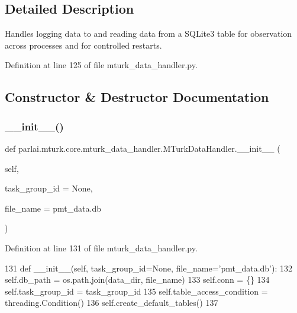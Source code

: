 \subsection{Detailed Description}
\begin{DoxyVerb}Handles logging data to and reading data from a SQLite3 table for observation across
processes and for controlled restarts.
\end{DoxyVerb}
 

Definition at line 125 of file mturk\+\_\+data\+\_\+handler.\+py.



\subsection{Constructor \& Destructor Documentation}
\mbox{\label{classparlai_1_1mturk_1_1core_1_1mturk__data__handler_1_1MTurkDataHandler_a7edbb0b1f770656a6ed49990cd3933c1}} 
\subsubsection{\texorpdfstring{\+\_\+\+\_\+init\+\_\+\+\_\+()}{\_\_init\_\_()}}
{\footnotesize\ttfamily def parlai.\+mturk.\+core.\+mturk\+\_\+data\+\_\+handler.\+M\+Turk\+Data\+Handler.\+\_\+\+\_\+init\+\_\+\+\_\+ (\begin{DoxyParamCaption}\item[{}]{self,  }\item[{}]{task\+\_\+group\+\_\+id = {\ttfamily None},  }\item[{}]{file\+\_\+name = {\ttfamily \textquotesingle{}pmt\+\_\+data.db\textquotesingle{}} }\end{DoxyParamCaption})}



Definition at line 131 of file mturk\+\_\+data\+\_\+handler.\+py.


\begin{DoxyCode}
131     \textcolor{keyword}{def }\_\_init\_\_(self, task\_group\_id=None, file\_name='pmt\_data.db'):
132         self.db\_path = os.path.join(data\_dir, file\_name)
133         self.conn = \{\}
134         self.task\_group\_id = task\_group\_id
135         self.table\_access\_condition = threading.Condition()
136         self.create\_default\_tables()
137 
\end{DoxyCode}


